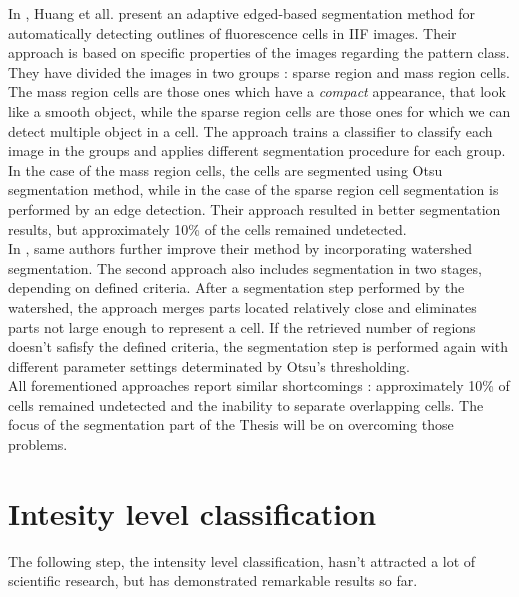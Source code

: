 In \cite{Huang2008}, Huang et all. present an adaptive edged-based segmentation method for automatically detecting outlines of fluorescence cells in IIF images. Their approach is based on specific properties of the images regarding the pattern class. They have divided the images in two groups : sparse region and mass region cells. The mass region cells are those ones which have a \textit{compact} appearance, that look like a smooth object, while the sparse region cells are those ones for which we can detect multiple object in a cell. The approach trains a classifier to classify each image in the groups and applies different segmentation procedure for each group. In the case of the mass region cells, the cells are segmented using Otsu segmentation method, while in the case of the sparse region cell segmentation is performed by an edge detection. Their approach resulted in better segmentation results, but approximately 10\% of the cells remained undetected. \\

In \cite{HuangWatershed}, same authors further improve their method by incorporating watershed segmentation. The second approach also includes segmentation in two stages, depending on defined criteria. After a segmentation step performed by the watershed, the approach merges parts located relatively close and eliminates parts not large enough to represent a cell. If the retrieved number of regions doesn't safisfy the defined criteria, the segmentation step is performed again with different parameter settings determinated by Otsu's thresholding. \\

All forementioned approaches report similar shortcomings : approximately 10\% of cells remained undetected and the inability to separate overlapping cells.  The focus of the segmentation part of the Thesis will be on overcoming those problems. \\




\section{Intesity level classification}

The following step, the intensity level classification, hasn't attracted a lot of scientific research, but has demonstrated remarkable results so far. \\

